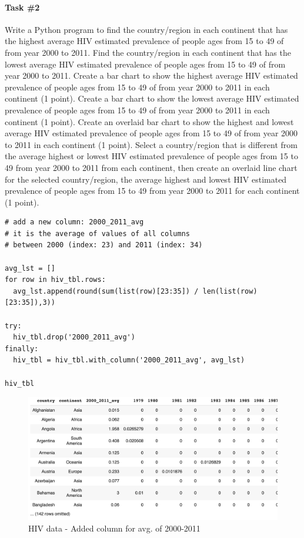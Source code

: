 \documentclass[UTF8, letter]{article}
\begin{document}
\paragraph{Task \#2}
Write a Python program to find the country/region in each continent that has the highest average HIV estimated prevalence of people ages from 15 to 49 of from year 2000 to 2011. Find the country/region in each continent that has the lowest average HIV estimated prevalence of people ages from 15 to 49 of from year 2000 to 2011. Create a bar chart to show the highest average HIV estimated prevalence of people ages from 15 to 49 of from year 2000 to 2011 in each continent (1 point). Create a bar chart to show the lowest average HIV estimated prevalence of people ages from 15 to 49 of from year 2000 to 2011 in each continent (1 point). Create an overlaid bar chart to show the highest and lowest average HIV estimated prevalence of people ages from 15 to 49 of from year 2000 to 2011 in each continent (1 point). Select a country/region that is different from the average highest or lowest HIV estimated prevalence of people ages from 15 to 49 from year 2000 to 2011 from each continent, then create an overlaid line chart for the selected country/region, the average highest and lowest HIV estimated prevalence of people ages from 15 to 49 from year 2000 to 2011 for each continent (1 point).

\begin{codeblock}
\begin{verbatim}
# add a new column: 2000_2011_avg
# it is the average of values of all columns 
# between 2000 (index: 23) and 2011 (index: 34)

avg_lst = []
for row in hiv_tbl.rows:
  avg_lst.append(round(sum(list(row)[23:35]) / len(list(row)[23:35]),3))

try:
  hiv_tbl.drop('2000_2011_avg')
finally:
  hiv_tbl = hiv_tbl.with_column('2000_2011_avg', avg_lst)

hiv_tbl
\end{verbatim}
\end{codeblock}

\begin{figure}[h!]
	\centering
	\includegraphics[width=0.8\linewidth]{output_5.png}
	\caption{HIV data - Added column for avg. of 2000-2011}
	\label{fig:boat1}
\end{figure}
\end{document}
